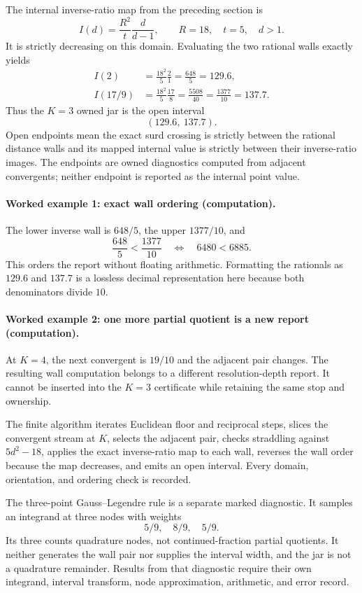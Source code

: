 The internal inverse-ratio map from the preceding section is
\[
                         I(d)=\frac{R^2}{t}\frac{d}{d-1},
\qquad R=18,\quad t=5,\quad d>1.
\]
It is strictly decreasing on this domain.  Evaluating the two rational walls exactly yields
\[
\begin{aligned}
I(2)&=\frac{18^2}{5}\frac{2}{1}=\frac{648}{5}=129.6,\\
I(17/9)&=\frac{18^2}{5}\frac{17}{8}
=\frac{5508}{40}=\frac{1377}{10}=137.7.
\end{aligned}
\]
Thus the \(K=3\) owned jar is the open interval
\[
                         \boxed{(129.6,\ 137.7)}.
\]
Open endpoints mean the exact surd crossing is strictly between the rational distance walls and its mapped internal
value is strictly between their inverse-ratio images.  The endpoints are owned diagnostics computed from adjacent
convergents; neither endpoint is reported as the internal point value.

\paragraph{Worked example 1: exact wall ordering (computation).}
The lower inverse wall is \(648/5\), the upper \(1377/10\), and
\[
                         \frac{648}{5}<\frac{1377}{10}
\quad\Longleftrightarrow\quad6480<6885.
\]
This orders the report without floating arithmetic.  Formatting the rationals as \(129.6\) and \(137.7\) is a
lossless decimal representation here because both denominators divide \(10\).

\paragraph{Worked example 2: one more partial quotient is a new report (computation).}
At \(K=4\), the next convergent is \(19/10\) and the adjacent pair changes.  The resulting wall computation belongs
to a different resolution-depth report.  It cannot be inserted into the \(K=3\) certificate while retaining the
same stop and ownership.

The finite algorithm iterates Euclidean floor and reciprocal steps, slices the convergent stream at \(K\), selects
the adjacent pair, checks straddling against \(5d^2-18\), applies the exact inverse-ratio map to each wall, reverses
the wall order because the map decreases, and emits an open interval.  Every domain, orientation, and ordering check
is recorded.

The three-point Gauss--Legendre rule is a separate marked diagnostic.  It samples an integrand at three nodes with
weights
\[
                         5/9,\quad8/9,\quad5/9.
\]
Its three counts quadrature nodes, not continued-fraction partial quotients.  It neither generates the wall pair nor
supplies the interval width, and the jar is not a quadrature remainder.  Results from that diagnostic require their
own integrand, interval transform, node approximation, arithmetic, and error record.

